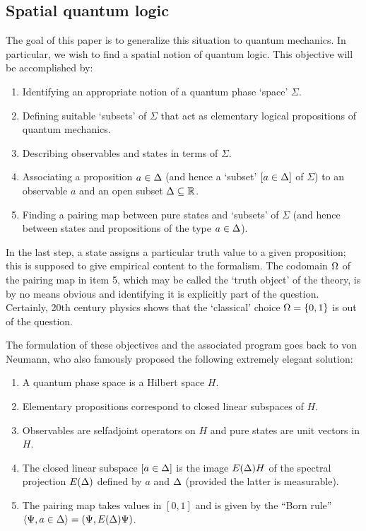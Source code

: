 \documentclass[11pt]{article}
\newcommand{\Sg}{\Sigma} \newcommand{\ta}{\tau} \newcommand{\ph}{\phi}
\begin{document}
\subsection{Spatial quantum logic}\label{subsec:SQL}
The goal of this paper is to generalize this  situation to
quantum mechanics. In particular, we wish to find a spatial notion of
quantum logic.
This objective will be accomplished by:
\begin{enumerate}
\item  Identifying an appropriate notion of a quantum phase `space' $\Sg$.
\item Defining suitable  `subsets' of $\Sg$  that act as  elementary logical propositions of quantum mechanics.
\item Describing observables and states in terms of $\Sg$.
\item Associating a proposition $a\in\Delta$ (and hence a
`subset' $[a\in\Delta]$ of $\Sg$) to an observable $a$ and an open subset $\Delta\subseteq{\mathbb R}$.
\item Finding a  pairing map between pure states and `subsets' of $\Sg$ (and hence between states and propositions of the type $a\in\Delta$).
\end{enumerate}
In the last step, a state assigns a particular truth value to a given proposition; this is supposed to  give empirical content to the formalism.
The codomain $\Omega$ of the pairing map in item 5, which may be called the `truth object' of the theory,
is by no means obvious and identifying it is explicitly part of the question.
Certainly, 20th century physics shows that
the `classical' choice $\Omega=\{0,1\}$ is out of the question.

The formulation of these objectives and the associated program goes back to
von Neumann, who also famously proposed the following extremely
elegant solution:
\begin{enumerate}
\item A quantum phase space is a Hilbert space $H$.
\item Elementary propositions correspond to closed linear subspaces of $H$.
\item Observables are selfadjoint operators on $H$ and pure states are unit vectors in $H$.
\item  The closed linear subspace $[a\in\Delta]$  is the image $E(\Delta)H$ of
the spectral projection $E(\Delta)$ defined by  $a$ and $\Delta$ (provided the latter is measurable).
\item The pairing map takes values in $[0,1]$ and is given by the ``Born rule''
 $\langle\Psi,a\in\Delta\rangle=(\Psi,E(\Delta)\Psi)$.
\end{enumerate}
\end{document}
